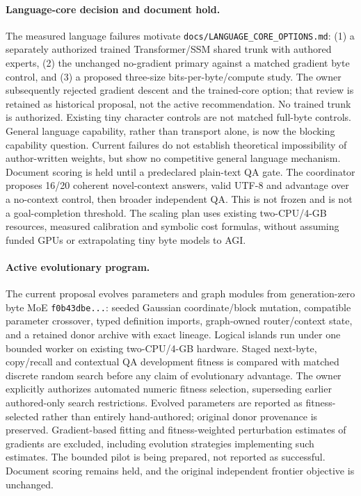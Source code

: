 \documentclass[11pt]{article}
\begin{document}
\paragraph{Language-core decision and document hold.}
The measured language failures motivate \texttt{docs/LANGUAGE\_CORE\_OPTIONS.md}:
(1) a separately authorized trained Transformer/SSM shared trunk with authored
experts, (2) the unchanged no-gradient primary against a matched gradient byte
control, and (3) a proposed three-size bits-per-byte/compute study. The owner
subsequently rejected gradient descent and the trained-core option; that review
is retained as historical proposal, not the active recommendation. No trained
trunk is authorized. Existing tiny character controls are not matched
full-byte controls. General language capability, rather than transport alone,
is now the blocking capability question. Current failures do not establish
theoretical impossibility of author-written weights, but show no competitive
general language mechanism. Document scoring is held until a predeclared
plain-text QA gate. The coordinator proposes 16/20 coherent novel-context answers,
valid UTF-8 and advantage over a no-context control, then broader independent
QA. This is not frozen and is not a goal-completion threshold. The scaling plan
uses existing two-CPU/4-GB resources, measured
calibration and symbolic cost formulas, without assuming funded GPUs or
extrapolating tiny byte models to AGI.

\paragraph{Active evolutionary program.}
The current proposal evolves parameters and graph modules from generation-zero
byte MoE \texttt{f0b43dbe...}: seeded Gaussian coordinate/block mutation,
compatible parameter crossover, typed definition imports,
graph-owned router/context state, and a retained donor archive with exact lineage.
Logical islands run under one bounded worker on existing two-CPU/4-GB hardware.
Staged next-byte, copy/recall and contextual QA development fitness is compared
with matched discrete random search before any claim of evolutionary advantage.
The owner explicitly authorizes automated numeric fitness selection, superseding
earlier authored-only search restrictions. Evolved parameters are reported as
fitness-selected rather than entirely hand-authored; original donor provenance
is preserved. Gradient-based fitting and fitness-weighted perturbation estimates of gradients
are excluded, including evolution strategies implementing such estimates. The
bounded pilot is being prepared, not reported as successful. Document scoring
remains held, and the original independent frontier objective is unchanged.
\end{document}
